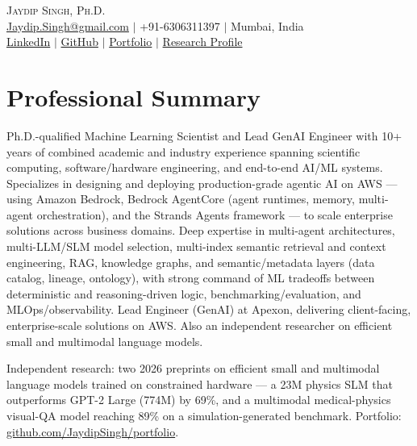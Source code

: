\documentclass[a4paper,10pt]{article}
\begin{document}
\begin{center}
    {\Huge \scshape Jaydip Singh, Ph.D.} \\ \vspace{5pt}
  \href{mailto:jaydip.singh@gmail.com}{Jaydip.Singh@gmail.com} $|$ +91-6306311397 $|$ Mumbai, India \\
    \href{https://www.linkedin.com/in/jaydip-singh-15714546}{LinkedIn} $|$
  \href{https://github.com/JaydipSingh}{GitHub} $|$
  \href{https://github.com/JaydipSingh/portfolio}{Portfolio} $|$
  \href{https://inspirehep.net/authors/1591917}{Research Profile}
\end{center}

\section{Professional Summary}
Ph.D.-qualified Machine Learning Scientist and Lead GenAI Engineer with 10+ years of combined academic and industry experience spanning scientific computing, software/hardware engineering, and end-to-end AI/ML systems. Specializes in designing and deploying production-grade agentic AI on AWS --- using Amazon Bedrock, Bedrock AgentCore (agent runtimes, memory, multi-agent orchestration), and the Strands Agents framework --- to scale enterprise solutions across business domains. Deep expertise in multi-agent architectures, multi-LLM/SLM model selection, multi-index semantic retrieval and context engineering, RAG, knowledge graphs, and semantic/metadata layers (data catalog, lineage, ontology), with strong command of ML tradeoffs between deterministic and reasoning-driven logic, benchmarking/evaluation, and MLOps/observability. Lead Engineer (GenAI) at Apexon, delivering client-facing, enterprise-scale solutions on AWS. Also an independent researcher on efficient small and multimodal language models.

Independent research: two 2026 preprints on efficient small and multimodal language models trained on constrained hardware --- a 23M physics SLM that outperforms GPT-2 Large (774M) by 69\%, and a multimodal medical-physics visual-QA model reaching 89\% on a simulation-generated benchmark. Portfolio: \href{https://github.com/JaydipSingh/portfolio}{github.com/JaydipSingh/portfolio}.
\end{document}
